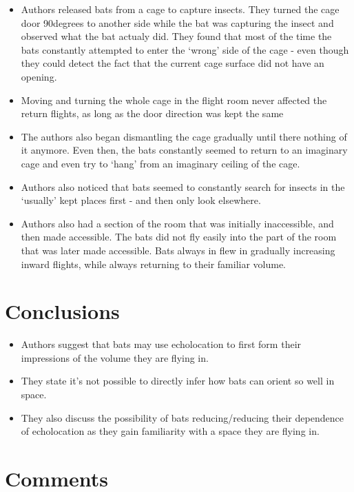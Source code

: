 \documentclass[
]{book}
\providecommand{\tightlist}{%
  \setlength{\itemsep}{0pt}\setlength{\parskip}{0pt}}
\begin{document}
\begin{itemize}
\item
  Authors released bats from a cage to capture insects. They turned the cage door 90degrees to another side while the bat was capturing the insect and observed what the bat actualy did. They found that most of the time the bats constantly attempted to enter the `wrong' side of the cage - even though they could detect the fact that the current cage surface did not have an opening.
\item
  Moving and turning the whole cage in the flight room never affected the return flights, as long as the door direction was kept the same
\item
  The authors also began dismantling the cage gradually until there nothing of it anymore. Even then, the bats constantly seemed to return to an imaginary cage and even try to `hang' from an imaginary ceiling of the cage.
\item
  Authors also noticed that bats seemed to constantly search for insects in the `usually' kept places first - and then only look elsewhere.
\item
  Authors also had a section of the room that was initially inaccessible, and then made accessible. The bats did not fly easily into the part of the room that was later made accessible. Bats always in flew in gradually increasing inward flights, while always returning to their familiar volume.
\end{itemize}

\hypertarget{conclusions}{%
\section{Conclusions}\label{conclusions}}

\begin{itemize}
\tightlist
\item
  Authors suggest that bats may use echolocation to first form their impressions of the volume they are flying in.
\item
  They state it's not possible to directly infer how bats can orient so well in space.
\item
  They also discuss the possibility of bats reducing/reducing their dependence of echolocation as they gain familiarity with a space they are flying in.
\end{itemize}

\hypertarget{comments}{%
\section{Comments}\label{comments}}
\end{document}
